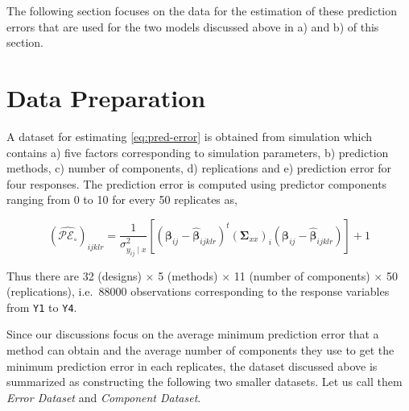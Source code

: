 \documentclass[review]{elsarticle}
\begin{document}
The following section focuses on the data for the estimation of these prediction errors that are used for the two models discussed above in a) and b) of this section.

\hypertarget{data-preparation}{%
\section{Data Preparation}\label{data-preparation}}

A dataset for estimating \eqref{eq:pred-error} is obtained from simulation which contains a) five factors corresponding to simulation parameters, b) prediction methods, c) number of components, d) replications and e) prediction error for four responses. The prediction error is computed using predictor components ranging from 0 to 10 for every 50 replicates as,

\begin{equation*}
\left(\widehat{\mathcal{PE_\circ}}\right)_{ijklr} =
  \frac{1}{\sigma_{y_{ij}\mid x}^2}\left[
    \left(\boldsymbol{\beta}_{ij} - \hat{\boldsymbol{\beta}}_{ijklr}\right)^t
    \left(\boldsymbol{\Sigma}_{xx}\right)_{i}
    \left(\boldsymbol{\beta}_{ij} - \hat{\boldsymbol{\beta}}_{ijklr}\right)
  \right] + 1
\end{equation*}

Thus there are 32 (designs) \(\times\) 5 (methods) \(\times\) 11 (number of components) \(\times\) 50 (replications), i.e.~88000 observations corresponding to the response variables from \texttt{Y1} to \texttt{Y4}.

Since our discussions focus on the average minimum prediction error that a method can obtain and the average number of components they use to get the minimum prediction error in each replicates, the dataset discussed above is summarized as constructing the following two smaller datasets. Let us call them \emph{Error Dataset} and \emph{Component Dataset}.
\end{document}

